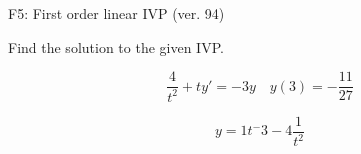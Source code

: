 \begin{exercise}
  \begin{exerciseTitle}F5: First order linear IVP (ver. 94)\end{exerciseTitle}
  \begin{exerciseStatement}
    
Find the solution to the given IVP.

    
\[\frac{4}{t^{2}} +ty'= -3 y \hspace{1em} y( 3 ) = -\frac{11}{27}\]

  \end{exerciseStatement}
  \begin{exerciseAnswer}
    
\[y= 1 t^ -3 -4 \frac{1}{t^{2}}\]

  \end{exerciseAnswer}
\end{exercise}